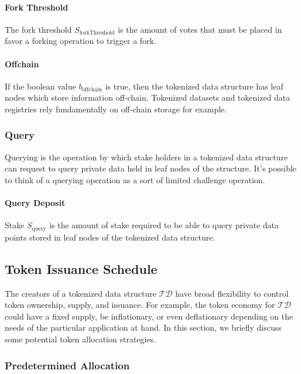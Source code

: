 \documentclass{llncs}
\begin{document}
\paragraph{Fork Threshold}

The fork threshold $S_\text{forkThreshold}$ is the amount of votes that must be placed in favor a forking operation to trigger a fork.



\paragraph{Offchain}
If the boolean value $b_\text{offchain}$ is true, then the tokenized data structure has leaf nodes which store information off-chain. Tokenized datasets and tokenized data registries rely fundamentally on off-chain storage for example.

\subsubsection{Query}

Querying is the operation by which stake holders in a tokenized data structure can request to query private data held in leaf nodes of the structure. It's possible to think of a querying operation as a sort of limited challenge operation.

\paragraph{Query Deposit}
Stake $S_\text{query}$ is the amount of stake required to be able to query private data points stored in leaf nodes of the tokenized data structure.

\subsection{Token Issuance Schedule}

The creators of a tokenized data structure $\mathcal{TD}$ have broad flexibility to control token ownership, supply, and issuance. For example, the token economy for $\mathcal{TD}$ could have a fixed supply, be inflationary, or even deflationary depending on the needs of the particular application at hand. In this section, we briefly discuss some potential token allocation strategies.

\subsubsection{Predetermined Allocation}
\end{document}
